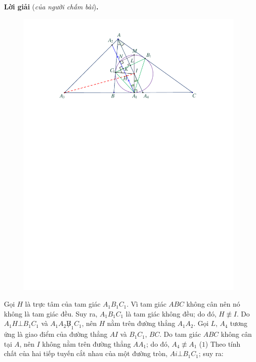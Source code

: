 \begin{multicols}{2}
	\vskip 0.05cm
	\textbf{\color{thachthuctoanhoc}Lời giải} (\textit{của người chấm bài})\textbf{\color{thachthuctoanhoc}.}
	\begin{figure}[H]
		\centering
		\vspace*{-10pt}
		\captionsetup{labelformat= empty, justification=centering}
		\includegraphics[width=1\linewidth]{P628}
		\vspace*{-15pt}
	\end{figure}
	Gọi $H$ là trực tâm của tam giác $A_1B_1C_1$.
	\vskip 0.05cm 
	Vì tam giác $ABC$ không cân nên nó không là tam giác đều. Suy ra, $A_1B_1C_1$  là tam giác không đều; do đó,  $H \not\equiv I$.
	\vskip 0.05cm
	Do $A_1H \bot B_1C_1$  và  $A_1A_2 \not B_1C_1$, nên $H$ nằm trên đường thẳng  $A_1A_2$.
	\vskip 0.05cm
	Gọi $L$, $A_4$  tương ứng là giao điểm của đường thẳng $AI$ và  $B_1C_1$, $BC$.
	\vskip 0.05cm
	Do tam giác $ABC$ không cân tại $A$, nên $I$ không nằm trên đường thẳng $AA_1$; do đó, $A_4 \not\equiv A_1$    \hfill ($1$)
	\vskip 0.05cm 
	Theo tính chất của hai tiếp tuyến cắt nhau của một đường tròn,  $Ai \bot B_1C_1$; suy ra:

\end{multicols}
